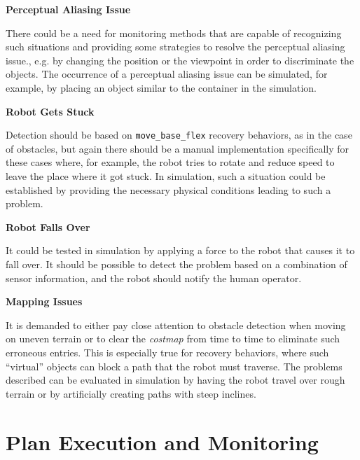 \documentclass[english, master, utf8]{base/thesis_KBS}
\newcommand{\code}[1]{\colorbox{light-gray}{\texttt{#1}}}
\begin{document}
\noindent
\textbf{Perceptual Aliasing Issue}\newline

\noindent
There could be a need for monitoring methods that are capable of recognizing such situations and providing some strategies to resolve the 
perceptual aliasing issue., e.g. by changing the position or the viewpoint in order to discriminate the objects.
The occurrence of a perceptual aliasing issue can be simulated, for example, by placing an object similar to the container in the simulation.\newline

\noindent
\textbf{Robot Gets Stuck}\newline

\noindent
Detection should be based on \code{move\_base\_flex} recovery behaviors, as in the case of obstacles, but again there should be a manual implementation 
specifically for these cases where, for example, the robot tries to rotate and reduce speed to leave the place where it got stuck.
In simulation, such a situation could be established by providing the necessary physical conditions leading to such a problem.\newline

\noindent
\textbf{Robot Falls Over}\newline

\noindent
It could be tested in simulation by applying a force to the robot that causes it to fall over.
It should be possible to detect the problem based on a combination of sensor information, and the robot should notify the human operator.\newline

\noindent
\textbf{Mapping Issues}\newline

\noindent
It is demanded to either pay close attention to obstacle detection when moving on uneven terrain or to clear the \textit{costmap} from time to time
to eliminate such erroneous entries. This is especially true for recovery behaviors,  where such ``virtual'' objects can block a path that the robot must traverse.
The problems described can be evaluated in simulation by having the robot travel over rough terrain or by artificially creating paths with steep inclines.

\chapter{Plan Execution and Monitoring}
\end{document}

